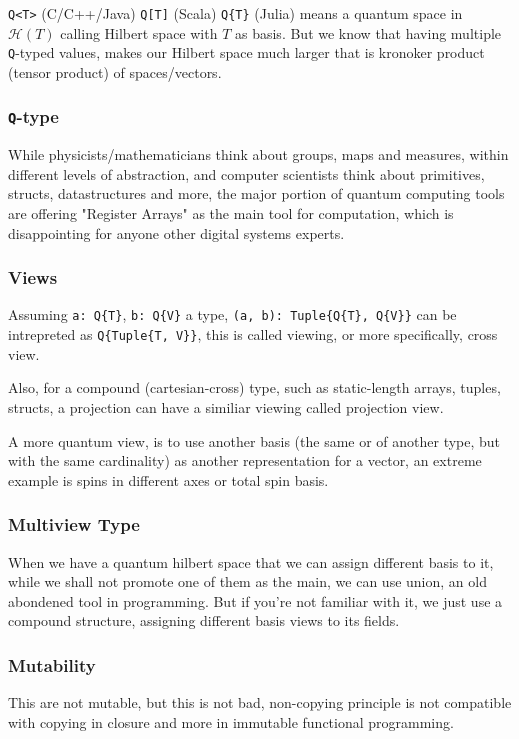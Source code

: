 \documentclass[a4paper,11pt]{article}
\def\co{\lstinline}
\begin{document}
\co{Q<T>} (C/C++/Java) \co{Q[T]} (Scala) \co|Q{T}| (Julia) means a quantum space in $\mathcal{H}(T)$ calling Hilbert space with $T$ as basis. But we know that having multiple \co{Q}-typed values, makes our Hilbert space much larger that is kronoker product (tensor product) of spaces/vectors.

\subsubsection{\co|Q|-type}
While physicists/mathematicians think about groups, maps and measures, within different levels of abstraction, and computer scientists think about primitives, structs, datastructures and more, the major portion of quantum computing tools are offering "Register Arrays" as the main tool for computation, which is disappointing for anyone other digital systems experts.

\subsubsection{Views}
Assuming \co|a: Q{T}|, \co|b: Q{V}| a type, \co|(a, b): Tuple{Q{T}, Q{V}}| can be intrepreted as \co|Q{Tuple{T, V}}|, this is called viewing, or more specifically, cross view.

Also, for a compound (cartesian-cross) type, such as static-length arrays, tuples, structs, a projection can have a similiar viewing called projection view.

A more quantum view, is to use another basis (the same or of another type, but with the same cardinality) as another representation for a vector, an extreme example is spins in different axes or total spin basis.

\subsubsection{Multiview Type}

When we have a quantum hilbert space that we can assign different basis to it, while we shall not promote one of them as the main, we can use union, an old abondened tool in programming. But if you're not familiar with it, we just use a compound structure, assigning different basis views to its fields. 

\subsubsection{Mutability}

This are not mutable, but this is not bad, non-copying principle is not compatible with copying in closure and more in immutable functional programming.
\end{document}
